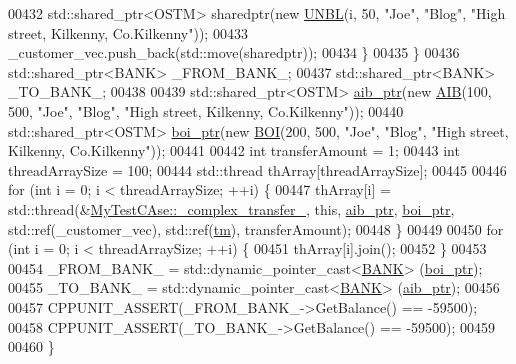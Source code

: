 \begin{DoxyCode}
00432             std::shared\_ptr<OSTM> sharedptr(\textcolor{keyword}{new} \hyperlink{class_u_n_b_l}{UNBL}(i, 50, \textcolor{stringliteral}{"Joe"}, \textcolor{stringliteral}{"Blog"}, \textcolor{stringliteral}{"High street, Kilkenny,
       Co.Kilkenny"}));
00433             \_customer\_vec.push\_back(std::move(sharedptr));
00434         \}
00435     \}
00436     std::shared\_ptr<BANK> \_FROM\_BANK\_;
00437     std::shared\_ptr<BANK> \_TO\_BANK\_;
00438     
00439     std::shared\_ptr<OSTM> \hyperlink{class_my_test_c_ase_adad50e8278b64aa0321000b528e5362c_adad50e8278b64aa0321000b528e5362c}{aib\_ptr}(\textcolor{keyword}{new} \hyperlink{class_a_i_b}{AIB}(100, 500, \textcolor{stringliteral}{"Joe"}, \textcolor{stringliteral}{"Blog"}, \textcolor{stringliteral}{"High street, Kilkenny,
       Co.Kilkenny"}));
00440     std::shared\_ptr<OSTM> \hyperlink{class_my_test_c_ase_a5554de9e3e6393a89c66c036c529720b_a5554de9e3e6393a89c66c036c529720b}{boi\_ptr}(\textcolor{keyword}{new} \hyperlink{class_b_o_i}{BOI}(200, 500, \textcolor{stringliteral}{"Joe"}, \textcolor{stringliteral}{"Blog"}, \textcolor{stringliteral}{"High street, Kilkenny,
       Co.Kilkenny"}));
00441     
00442     \textcolor{keywordtype}{int} transferAmount = 1;
00443     \textcolor{keywordtype}{int} threadArraySize = 100; 
00444     std::thread thArray[threadArraySize];
00445    
00446     \textcolor{keywordflow}{for} (\textcolor{keywordtype}{int} i = 0; i < threadArraySize; ++i) \{
00447         thArray[i] = std::thread(&\hyperlink{class_my_test_c_ase_a2367b87338c4f61cc3ac3193651580d4_a2367b87338c4f61cc3ac3193651580d4}{MyTestCAse::\_complex\_transfer\_}, \textcolor{keyword}{this}, 
      \hyperlink{class_my_test_c_ase_adad50e8278b64aa0321000b528e5362c_adad50e8278b64aa0321000b528e5362c}{aib\_ptr}, \hyperlink{class_my_test_c_ase_a5554de9e3e6393a89c66c036c529720b_a5554de9e3e6393a89c66c036c529720b}{boi\_ptr}, std::ref(\_customer\_vec),  std::ref(\hyperlink{class_my_test_c_ase_a422e6e5d4ddedea384be96031c89b72b_a422e6e5d4ddedea384be96031c89b72b}{tm}), transferAmount);
00448     \}
00449     
00450     \textcolor{keywordflow}{for} (\textcolor{keywordtype}{int} i = 0; i < threadArraySize; ++i) \{
00451         thArray[i].join();
00452     \}
00453     
00454     \_FROM\_BANK\_ = std::dynamic\_pointer\_cast<\hyperlink{class_b_a_n_k}{BANK}> (\hyperlink{class_my_test_c_ase_a5554de9e3e6393a89c66c036c529720b_a5554de9e3e6393a89c66c036c529720b}{boi\_ptr});
00455     \_TO\_BANK\_ = std::dynamic\_pointer\_cast<\hyperlink{class_b_a_n_k}{BANK}> (\hyperlink{class_my_test_c_ase_adad50e8278b64aa0321000b528e5362c_adad50e8278b64aa0321000b528e5362c}{aib\_ptr});
00456     
00457     CPPUNIT\_ASSERT(\_FROM\_BANK\_->GetBalance() == -59500);
00458     CPPUNIT\_ASSERT(\_TO\_BANK\_->GetBalance() == -59500);
00459     
00460 \}
\end{DoxyCode}


